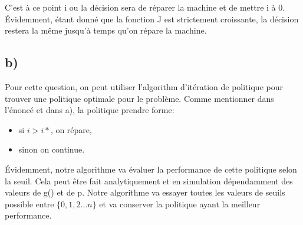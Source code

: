 \documentclass[oneside]{book}
\begin{document}
C'est à ce point i ou la décision sera de réparer la machine et de mettre i à 0. Évidemment, étant donné que la fonction J est strictement croissante, la décision restera la même jusqu'à temps qu'on répare la machine.

\subsection*{b)}
Pour cette question, on peut utiliser l'algorithm d'itération de politique pour trouver une politique optimale pour le problème. Comme mentionner dans l'énoncé et dans a), la politique prendre forme:\\

\begin{itemize}
\item si $i > i*$, on répare,\\
\item sinon on continue.
\end{itemize}

Évidemment, notre algorithme va évaluer la performance de cette politique selon la seuil. Cela peut être fait analytiquement et en simulation dépendamment des valeurs de g() et de p. Notre algorithme va essayer toutes les valeurs de seuils possible entre $\{0,1,2...n\}$ et va conserver la politique ayant la meilleur performance.
\end{document}
